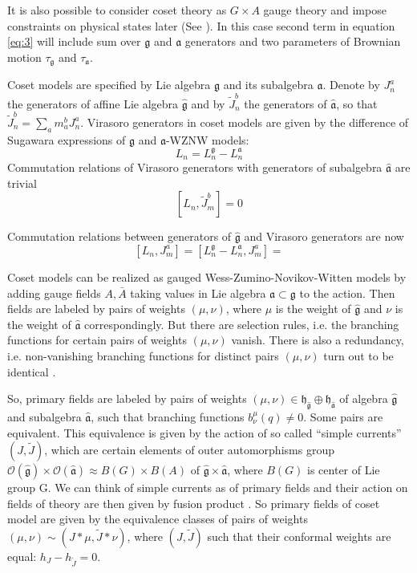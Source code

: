 \documentclass[a4paper]{article}
\theoremstyle{definition}
\newcommand{\gf}{\mathfrak{g}}
\newcommand{\af}{\mathfrak{a}}
\newcommand{\hf}{\mathfrak{h}}
\newcommand{\gfh}{\hat{\mathfrak{g}}}
\newcommand{\afh}{\hat{\mathfrak{a}}}
\theoremstyle{definition} \newtheorem{Def}{Definition}
\begin{document}
It is also possible to consider coset theory as $G\times A$  gauge theory and impose constraints on physical states later (See \cite{hwang1993brst,kogan1997knizhnik,gawdzki1988g,figueroa89equivalence}). In this case second term in equation \eqref{eq:3} will include sum over $\gf$ and $\af$ generators and two parameters of Brownian motion $\tau_{\gf}$ and $\tau_{\af}$. 




Coset  models are specified by Lie algebra
$\gf$ and its subalgebra $\af$. Denote by $J_{n}^{a}$ the generators of affine Lie algebra $\gfh$
and by $\tilde{J}_{n}^{b}$ the generators of $\afh$, so that $\tilde{J}^{b}_{n}=\sum_{a} m_{a}^{b}
J^{a}_{n}$. 
Virasoro generators in coset models are given by the difference of Sugawara expressions
of $\gf$ and $\af$-WZNW models:
\begin{equation*} L_{n}=L_{n}^{\gf}-L_{n}^{\af}
\end{equation*}
 Commutation relations of Virasoro generators with generators of subalgebra $\afh$
are trivial
\begin{equation}
  \label{eq:26} \left[L_{n},\tilde{J}^{b}_{m}\right]=0
\end{equation}

Commutation relations between generators of $\gfh$ and Virasoro generators are now
\begin{equation}
  \label{eq:1}
  \left[ L_{n}, J_{m}^{a} \right] = [L_{n}^{\gf}-L_{n}^{\af},J_{m}^{a}]= 
\end{equation}

Coset models can be realized as gauged Wess-Zumino-Novikov-Witten models by adding gauge fields
 $A,
\bar{A}$ taking values in Lie algebra $\af\subset \gf$ to the action\cite{gawdzki1988g}.
 Then fields
are labeled by pairs of weights $(\mu,\nu)$, where $\mu$ is the weight of $\gfh$ and $\nu$ is the
weight of $\afh$ correspondingly. But there are selection rules, i.e. the branching functions for
certain pairs of weights $(\mu,\nu)$ vanish. There is also a redundancy, i.e. non-vanishing
branching functions for distinct pairs $(\mu,\nu)$ turn out to be identical
\cite{fuchs1996resolution,schellekens1990field}.

So, primary fields are labeled by pairs of weights $(\mu,\nu)\in \hf_{\gfh}\oplus \hf_{\afh}$ of
algebra $\gfh$ and subalgebra $\afh$, such that branching functions $b^{\mu}_{\nu}(q)\neq 0$. Some
pairs are equivalent. This equivalence is given by the action of so called ``simple currents''
$(J,\tilde{J})$, which are certain elements of outer automorphisms group $\mathcal{O}(\gfh)\times
\mathcal{O}(\afh)\approx B(G)\times B(A)$ of $\gfh\times\afh$, where $B(G)$ is center of Lie group
G. We can think of simple currents as of primary fields and their action on fields of theory are
then given by fusion product \cite{difrancesco1997cft}. So primary fields of coset model are given
by the equivalence classes of pairs of weights $(\mu,\nu)\sim (J*\mu,\tilde{J}*\nu)$, where
$(J,\tilde J)$ such that their conformal weights are equal: $h_{J}-h_{\tilde{J}}=0$.
\end{document}
